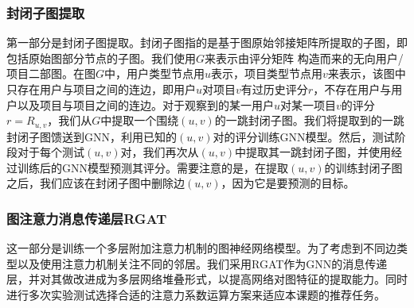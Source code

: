 \documentclass{ctexart}
\begin{document}
\subsubsection{封闭子图提取}
第一部分是封闭子图提取。封闭子图指的是基于图原始邻接矩阵所提取的子图，即包括原始图部分节点的子图。我们使用$G$来表示由评分矩阵 构造而来的无向用户/项目二部图。在图$G$中，用户类型节点用$u$表示，项目类型节点用$v$来表示，该图中只存在用户与项目之间的连边，即用户$u$对项目$v$有过历史评分$r$，不存在用户与用户以及项目与项目之间的连边。对于观察到的某一用户$u$对某一项目$v$的评分$r=R_{u,v}$，我们从$G$中提取一个围绕$(u,v)$的一跳封闭子图。我们将提取到的一跳封闭子图馈送到GNN，利用已知的$(u,v)$对的评分训练GNN模型。然后，测试阶段对于每个测试$(u,v)$对，我们再次从$(u,v)$中提取其一跳封闭子图，并使用经过训练后的GNN模型预测其评分。需要注意的是，在提取$(u,v)$的训练封闭子图之后，我们应该在封闭子图中删除边$(u,v)$，因为它是要预测的目标。

\subsubsection{图注意力消息传递层RGAT}
这一部分是训练一个多层附加注意力机制的图神经网络模型。为了考虑到不同边类型以及使用注意力机制关注不同的邻居。我们采用RGAT作为GNN的消息传递层，并对其做改进成为多层网络堆叠形式，以提高网络对图特征的提取能力。同时进行多次实验测试选择合适的注意力系数运算方案来适应本课题的推荐任务。
\end{document}
